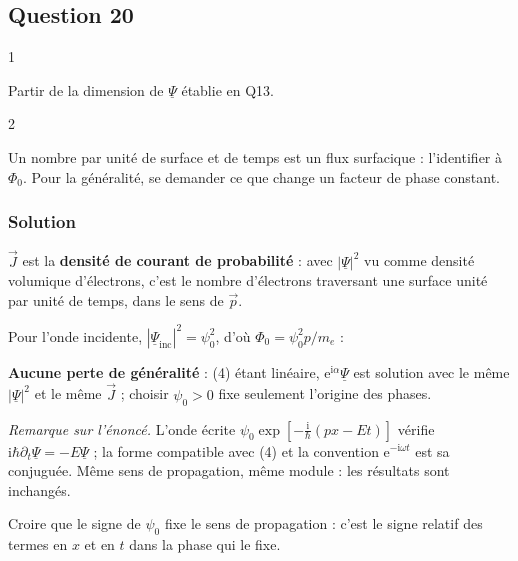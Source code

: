 \documentclass[11pt,a4paper]{article}
\newcommand{\equationajustee}[1]{%
  \sbox{\boiteequation}{$\displaystyle #1$}%
  \ifdim\wd\boiteequation>\linewidth
    \[\resizebox{\linewidth}{!}{\usebox{\boiteequation}}\]%
  \else
    \[#1\]%
  \fi}
\begin{document}
\hypertarget{question-20}{%
\subsection{Question 20}\label{question-20}}

\begin{indication}{1}

Partir de la dimension de \(\underline\Psi\) établie en Q13.

\end{indication}

\begin{indication}{2}

Un nombre par unité de surface et de temps est un flux surfacique : l'identifier à \(\Phi_0\). Pour la généralité, se demander ce que change un facteur de phase constant.

\end{indication}

\hypertarget{solution-19}{%
\subsubsection{Solution}\label{solution-19}}

\equationajustee{\boxed{[\vec J]=L^{-3}\cdot L\cdot T^{-1}=L^{-2}\cdot T^{-1}}}

\(\vec J\) est la \textbf{densité de courant de probabilité} : avec \(|\underline\Psi|^2\) vu comme densité volumique d'électrons, c'est le nombre d'électrons traversant une surface unité par unité de temps, dans le sens de \(\vec p\).

Pour l'onde incidente, \(|\underline\Psi_{\mathrm{inc}}|^2=\psi_0^2\), d'où \(\Phi_0=\psi_0^2p/m_e\) :

\equationajustee{\boxed{\psi_0=\sqrt{\frac{m_e\Phi_0}p}}}

\textbf{Aucune perte de généralité} : (4) étant linéaire, \(\mathrm e^{\mathrm i\alpha}\underline\Psi\) est solution avec le même \(|\underline\Psi|^2\) et le même \(\vec J\) ; choisir \(\psi_0>0\) fixe seulement l'origine des phases.

\emph{Remarque sur l'énoncé.} L'onde écrite \(\psi_0\exp[-\frac{\mathrm i}\hbar(px-Et)]\) vérifie \(\mathrm i\hbar\partial_t\underline\Psi=-E\underline\Psi\) ; la forme compatible avec (4) et la convention \(\mathrm e^{-\mathrm i\omega t}\) est sa conjuguée. Même sens de propagation, même module : les résultats sont inchangés.

\begin{piege}

Croire que le signe de \(\psi_0\) fixe le sens de propagation : c'est le signe relatif des termes en \(x\) et en \(t\) dans la phase qui le fixe.

\end{piege}
\end{document}

